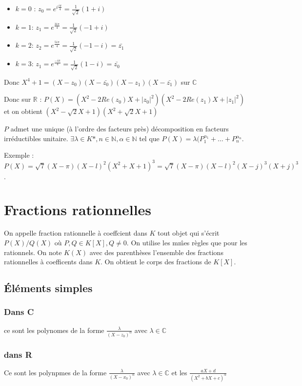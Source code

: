 \documentclass[french]{yLectureNote}
\begin{document}
\begin{itemize}
\item $k=0$ : $z_0 = e^{i\frac{i\pi}{4}} = \frac{1}{\sqrt{2}}(1+i)$
 \item $k= 1$: $ z_1 = e^{\frac{3i\pi}{4}} = \frac{1}{\sqrt{2}}(-1+i)$
  \item $k= 2$: $ z_2 = e^{\frac{5i\pi}{4}} = \frac{1}{\sqrt{2}}(-1-i) = \bar{z_1}$
   \item $k= 3$: $ z_1 = e^{\frac{-i\pi}{4}} = \frac{1}{\sqrt{2}}(1-i) = \bar{z_0}$
\end{itemize}
Donc $X^4+1 = (X-z_0)(X-\bar{z_0})(X-z_1)(X-\bar{z_1})$ sur $\mathbb{C}$

Donc sur $\mathbb{R}$ : $P(X) = (X^2-2Re(z_0)X+|z_0|^2)(X^2-2Re(z_1)X+|z_1|^2)$ et on obtient $(X^2-\sqrt{2}X+1)(X^2+\sqrt{2}X+1)$

\begin{theorem}[]
$P$ admet une unique (à l'ordre des facteurs près) décomposition en facteurs irréductibles unitaire. $\exists \lambda \in K*, n\in\mathbb{N}, \alpha \in\mathbb{N}$ tel que $P(X) = \lambda(P_1^{\alpha_1}+\dots+P_n^{\alpha_n}$.
\end{theorem}
Exemple : $P(X) = \sqrt{7}(X-\pi)(X-l)^2(X^2+X+1)^3 =  \sqrt{7}(X-\pi)(X-l)^2(X-j)^3(X+j)^3$.

\section{Fractions rationnelles}
On appelle fraction rationnelle à coeffcient dans $K$ tout objet qui s'écrit $P(X)/Q(X)$ où $P,Q\in K[X],Q\neq0$. On utilise les m\^mes règles que pour les rationnels. On note $K(X)$ avec des parenthèses l'ensemble des fractions rationnelles à coefficents dans $K$. On obtient le corps des fractions de $K[X]$.

\subsection{Éléments simples}
\subsubsection{Dans C}
ce sont les polynomes de la forme $\frac{\lambda}{(X-z_0)^{\alpha}}$ avec $\lambda \in\mathbb{C}$

\subsubsection{dans R}
Ce sont les polynpmes de la forme $\frac{\lambda}{(X-x_0)^{\alpha}}$ avec $\lambda \in\mathbb{C}$ et les $\frac{aX+d}{(X^2+bX+c)^{\alpha}}$
\end{document}
